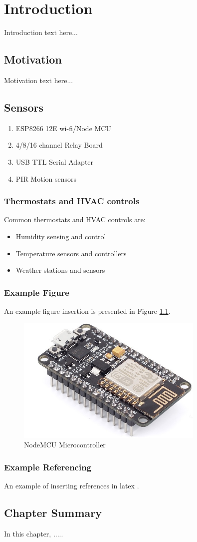 

\chapter{Introduction}
Introduction text here...

\section{Motivation}
Motivation text here... 

\section{Sensors}
\begin{enumerate}
\item ESP8266 12E wi-fi/Node MCU	
\item 4/8/16 channel Relay Board				
\item USB TTL Serial Adapter
\item PIR Motion sensors 
\end{enumerate}

\subsection{Thermostats and HVAC controls}
Common thermostats and HVAC controls  are:
\begin{itemize}
\item 	Humidity sensing and control  
\item 	Temperature sensors and controllers    
\item 	Weather stations and sensors  
\end{itemize}

\subsection{Example Figure}
An example figure insertion is presented  in  Figure \ref{fig1}.

\begin{figure}[H]
\begin{center}
\includegraphics[width=0.8\textwidth]{fig1}
\end{center}
\caption{NodeMCU Microcontroller}
\label{fig1}
\end{figure}

\subsection{Example Referencing}
An example of inserting references in latex \cite{7890229} \cite{swapnil2016}. 

\section{Chapter Summary}
In this chapter, .....  
